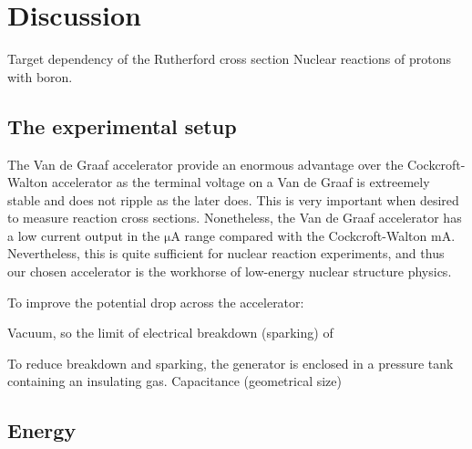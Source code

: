 \section{Discussion}
Target dependency of the Rutherford cross section
Nuclear reactions of protons with boron.
\subsection{The experimental setup}
The Van de Graaf accelerator provide an enormous advantage over the
Cockcroft-Walton accelerator as the terminal voltage on a Van de Graaf is
extreemely stable and does not ripple as the later does. This is very important
when desired to measure reaction cross sections. Nonetheless, the Van de Graaf
accelerator has a low current output in the $\si{\micro\ampere}$ range compared
with the Cockcroft-Walton $\si{\milli\ampere}$. Nevertheless, this is quite
sufficient for nuclear reaction experiments, and thus our chosen accelerator is
the workhorse of low-energy nuclear structure physics.

To improve the potential drop across the accelerator:

Vacuum, so the limit of electrical breakdown (sparking) of 

To reduce breakdown and sparking, the generator is enclosed in a pressure tank
containing an insulating gas.
Capacitance (geometrical size)
\cite{krane}

\subsection{Energy}


